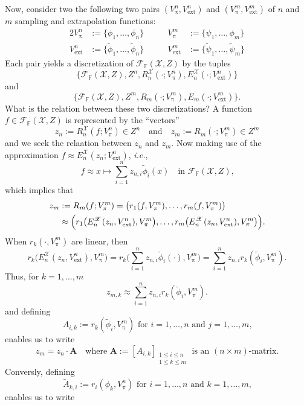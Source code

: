 \documentclass[a4paper]{paper}
\newcommand{\Spc}[1]{\mathscr{#1}}
\newcommand{\Field}{\mathbb{F}}
\newcommand*{\EXT}[2]{\ensuremath{E_{#1}^{#2}}}
\newcommand*{\REST}[2]{\ensuremath{R_{#1}^{#2}}}
\newcommand*{\RnX}{\ensuremath{\REST{n}{\Spc{X}}}}
\newcommand*{\EnX}{\ensuremath{\EXT{n}{\Spc{X}}}}
\DeclareMathOperator{\rest}{\pi}
\newcommand{\ie}{\textsl{i.e.}\xspace}
\newcommand{\vA}{\boldsymbol{A}}
\newcommand{\cF}{\mathcal{F}}
\newcommand{\ext}{\text{ext}}
\newcommand{\wt}[1]{\widetilde{#1}}
\begin{document}
Now, consider two the following two pairs $(V^n_{\rest},V^n_{\ext})$ and 
$(V^m_{\rest},V^m_{\ext})$ of $n$ and $m$ sampling and extrapolation 
functions:
\begin{alignat*}{2}
  V^n_{\rest} &:=\{ \phi_{1},\ldots,\phi_{n} \} &\qquad
  V^m_{\rest} &:=\{ \psi_{1},\ldots,\phi_{m} \}  \\
  V^n_{\ext} &:=\{ \wt{\phi}_{1},\ldots,\wt{\phi}_{n} \} &\qquad
  V^m_{\ext} &:=\{ \wt{\psi}_{1},\ldots,\wt{\psi}_{m} \}    
\end{alignat*}
Each pair yields a discretization of $\cF_{\Field}(\Spc{X},Z)$ by the tuples
\[ 
   \bigl\{
     \cF_{\Field}(\Spc{X},Z),Z^n,\RnX(\cdot;V^n_{\rest}),\EnX(\cdot;V^n_{\ext})
   \bigr\} \]
and
\[ \bigl\{
     \cF_{\Field}(\Spc{X},Z),Z^m,R_{m}(\cdot;V^m_{\rest}),E_{m}(\cdot;V^m_{\ext})
   \bigr\}. \] 
What is the relation between these two discretizations? A function 
$f\in \cF_{\Field}(\Spc{X},Z)$ is represented by the ``vectors'' 
\[ z_{n}:= \RnX(f;V^n_{\rest})\in Z^n \quad\text{and}\quad
   z_{m}:= R_{m}(\cdot;V^m_{\rest})\in Z^m \]
and we seek the relaation between $z_{n}$ and $z_{m}$. 
Now making use of the approximation $f\approx 
\EnX(z_{n};V^n_{\ext})$, \ie,
\[ f \approx x \mapsto 
       \sum_{i=1}^n z_{n,i} \wt{\phi}_{i}(x)
   \quad\text{in $\cF_{\Field}(\Spc{X},Z)$,} 
\]
which implies that
\begin{align*}
  z_{m} &:=R_{m}(f;V^m_{\rest}) =
    \bigl( r_{1}(f,V^m_{\rest}),\ldots,r_{m}(f,V^m_{\rest}) \bigr) \\
    &\approx 
      \Bigl( r_{1}\bigl(\EnX(z_{n},V^n_{\ext}),V^m_{\rest}\bigr),
             \ldots,
	     r_{m}\bigl(\EnX(z_{n},V^n_{\ext}),V^m_{\rest}\bigr)
      \Bigr).
\end{align*}
When $r_{k}(\cdot,V^m_{\rest})$ are linear, then 
\[ r_{k}\bigl(\EnX(z_{n},V^n_{\ext}),V^m_{\rest}\bigr)=
     r_{k}\biggl(\sum_{i=1}^n 
       z_{n,i}\wt{\phi}_{i}(\cdot),V^m_{\rest}\biggr)=
     \sum_{i=1}^n z_{n,i} r_{k}(\wt{\phi}_{i},V^m_{\rest}).
\]   
Thus, for $k=1,\ldots,m$
\[
  z_{m,k}\approx 
    \sum_{i=1}^n z_{n,i} r_{k}(\wt{\phi}_{i},V^m_{\rest}).
\]    
and defining 
\[ A_{i,k}:= r_{k}(\wt{\phi}_{i},V^m_{\rest})
   \text{ for $i=1,\ldots,n$ and $j=1,\ldots,m$,} \]
enables us to write
\[ z_{m}=z_{n}\cdot\vA
   \quad\text{where } 
   \vA:=[ A_{i,k} ]_{\substack{1\leq i \leq n \\ 1\leq k \leq m}}
   \text{ is an $(n\times m)$-matrix.} \]
Conversly, defining 
\[ \wt{A}_{k,i}:=r_{i}(\phi_{k},V^n_{\rest})
   \text{ for $i=1,\ldots,n$ and $k=1,\ldots,m$,} \]
enables us to write
\end{document}
